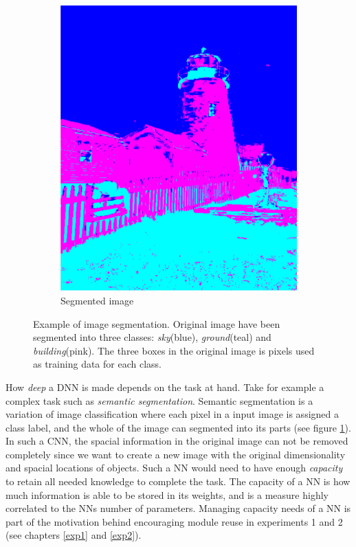 \begin{figure}
    \hfill
    \begin{subfigure}[h]{0.49\linewidth}
        \includegraphics[width=\linewidth]{Chapters/2.Background/figures/segmentation.png}
        \caption{Segmented image}
    \end{subfigure}
    \caption{Example of image segmentation. Original image have been segmented into three classes: \textit{sky}(blue), \textit{ground}(teal) and \textit{building}(pink). The three boxes in the original image is pixels used as training data for each class.}
    \label{fig:semanticsegmentation}
\end{figure}

How \textit{deep} a DNN is made depends on the task at hand. Take for example a complex task such as \textit{semantic segmentation}. Semantic segmentation is a variation of image classification where each pixel in a input image is assigned a class label, and the whole of the image can segmented into its parts (see figure \ref{fig:semanticsegmentation}). In such a CNN, the spacial information in the original image can not be removed completely since we want to create a new image with the original dimensionality and spacial locations of objects. Such a NN would need to have enough \textit{capacity} to retain all needed knowledge to complete the task. The capacity of a NN is how much information is able to be stored in its weights, and is a measure highly correlated to the NNs number of parameters. Managing capacity needs of a NN is part of the motivation behind encouraging module reuse in experiments 1 and 2 (see chapters \ref{exp1} and \ref{exp2}).

